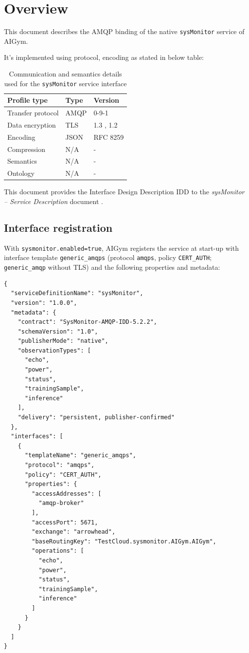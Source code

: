 \documentclass[a4paper]{arrowhead}
\begin{document}
\section{Overview}
\label{sec:overview}

This document describes the AMQP binding of the native \texttt{sysMonitor} service of AIGym.

It's implemented using protocol, encoding as stated in below table:
\begin{table}[ht!]
  \centering
  \begin{tabular}{|l|l|l|}
    \hline
    \rowcolor{gray!33} Profile type & Type & Version \\ \hline
    Transfer protocol & AMQP & 0-9-1 \cite{amqp091} \\ \hline
    Data encryption & TLS & 1.3 \cite{rfc8446}, 1.2 \cite{rfc5246} \\ \hline
    Encoding & JSON & RFC 8259 \cite{rfc8259} \\ \hline
    Compression & N/A & - \\ \hline
    Semantics & N/A & - \\ \hline
    Ontology & N/A & - \\ \hline
  \end{tabular}
  \caption{Communication and semantics details used for the \texttt{sysMonitor} service interface}
  \label{tab:comunication_semantics_profile}
\end{table}

This document provides the Interface Design Description IDD to the \textit{sysMonitor -- Service Description} document \cite{aig-sysMonitor-sd}.

\subsection{Interface registration}

With \texttt{sysmonitor.enabled=true}, AIGym registers the service at start-up with interface template \texttt{generic\_\allowbreak{}amqps} (protocol \texttt{amqps}, policy \texttt{CERT\_\allowbreak{}AUTH}; \texttt{generic\_\allowbreak{}amqp} without TLS) and the following properties and metadata:

\begin{lstlisting}[caption={Registered service instance (TestCloud).}]
{
  "serviceDefinitionName": "sysMonitor",
  "version": "1.0.0",
  "metadata": {
    "contract": "SysMonitor-AMQP-IDD-5.2.2",
    "schemaVersion": "1.0",
    "publisherMode": "native",
    "observationTypes": [
      "echo",
      "power",
      "status",
      "trainingSample",
      "inference"
    ],
    "delivery": "persistent, publisher-confirmed"
  },
  "interfaces": [
    {
      "templateName": "generic_amqps",
      "protocol": "amqps",
      "policy": "CERT_AUTH",
      "properties": {
        "accessAddresses": [
          "amqp-broker"
        ],
        "accessPort": 5671,
        "exchange": "arrowhead",
        "baseRoutingKey": "TestCloud.sysmonitor.AIGym.AIGym",
        "operations": [
          "echo",
          "power",
          "status",
          "trainingSample",
          "inference"
        ]
      }
    }
  ]
}
\end{lstlisting}
\end{document}
